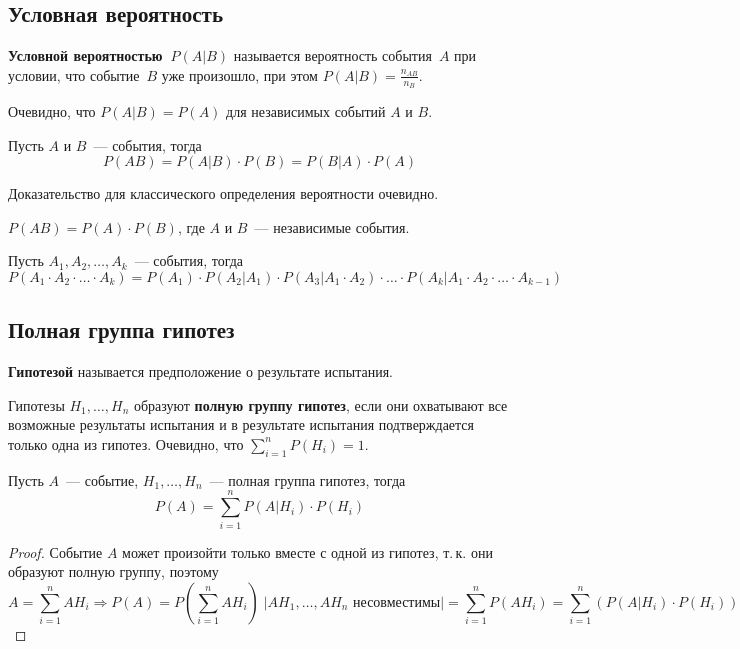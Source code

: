 \subsection{Условная вероятность}
 \textbf{Условной вероятностью~$P(A \vert B)$} называется вероятность события~$A$ при условии, что событие~$B$ уже произошло, при этом $P(A \vert B) = \frac{n_{AB}}{n_B}$.

Очевидно, что $P(A \vert B) = P(A)$ для независимых событий $A$ и $B$.

\begin{theorem}
Пусть $A$ и $B$~--- события, тогда
\begin{equation*}
P(AB) = P(A \vert B) \cdot P(B) = P(B \vert A) \cdot P(A)
\end{equation*}
\end{theorem}%
Доказательство для классического определения вероятности очевидно.

\begin{consequent}
$P(AB) = P(A) \cdot P(B)$, где $A$ и $B$~--- независимые события.
\end{consequent}

\begin{theorem}
Пусть $A_1, A_2, \ldots, A_k$~--- события, тогда
\begin{equation*}
P(A_1 \cdot A_2 \cdot \ldots \cdot A_k) = P(A_1) \cdot P(A_2 \vert A_1) \cdot P(A_3 \vert A_1 \cdot A_2) \cdot \ldots \cdot P(A_k \vert A_1 \cdot A_2 \cdot \ldots \cdot A_{k-1})
\end{equation*}
\end{theorem}

\subsection{Полная группа гипотез}
 \textbf{Гипотезой} называется предположение о результате испытания.

Гипотезы $H_1, \ldots, H_n$ образуют \textbf{полную группу гипотез}, если они охватывают все возможные результаты испытания и в результате испытания подтверждается только одна из гипотез.
Очевидно, что $\sum\limits_{i=1}^n P(H_i) = 1$.

\begin{theorem}
Пусть $A$~--- событие, $H_1, \ldots, H_n$~--- полная группа гипотез, тогда
\begin{equation*}
P(A) = \sum_{i=1}^n P(A \vert H_i) \cdot P(H_i)
\end{equation*}
\end{theorem}
\begin{proof}
Событие $A$ может произойти только вместе с одной из гипотез, т.\,к. они образуют полную группу, поэтому
\begin{equation*}
A = \sum_{i=1}^n A H_i \Rightarrow
P(A) =
P\left(\sum_{i=1}^n A H_i\right) \;
\left| A H_1, \ldots, A H_n \text{ несовместимы} \right| =
\sum_{i=1}^n P(A H_i) =
\sum_{i=1}^n (P(A \vert H_i) \cdot P(H_i))
\end{equation*}
\end{proof}

